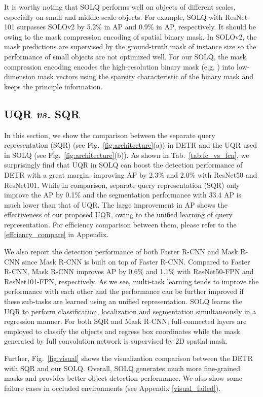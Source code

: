 \documentclass{article}
\begin{document}
It is worthy noting that SOLQ performs well on objects of different scales, especially on small and middle scale objects. For example, SOLQ with ResNet-101 surpasses SOLOv2 by 5.2\% in AP and 0.9\% in AP, respectively. It should be owing to the mask compression encoding of spatial binary mask. In SOLOv2, the mask predictions are supervised by the ground-truth mask of  instance size so the performance of small objects are not optimized well. For our SOLQ, the mask compression encoding encodes the high-resolution binary mask (e.g. ) into low-dimension mask vectors using the sparsity characteristic of the binary mask and keeps the principle information. 

\subsection{UQR \textit{vs.} SQR}
\label{uqr_vs_sqr}
In this section, we show the comparison between the separate query representation (SQR) (see Fig.~\ref{fig:architecture}(a)) in DETR and the UQR used in SOLQ (see Fig.~\ref{fig:architecture}(b)). As shown in Tab.~\ref{tab:fc_vs_fcn}, we surprisingly find that UQR in SOLQ can boost the detection performance of DETR with a great margin, improving AP by 2.3\% and 2.0\% with ResNet50 and ResNet101. While in comparison, separate query representation (SQR) only improve the AP by 0.1\% and the segmentation performance with 33.4 AP is much lower than that of UQR. The large improvement in AP shows the effectiveness of our proposed UQR, owing to the unified learning of query representation. For efficiency comparison between them, please refer to the \ref{effciency_compare} in Appendix.

We also report the detection performance of both Faster R-CNN and Mask R-CNN since Mask R-CNN is built on top of Faster R-CNN. Compared to Faster R-CNN, Mask R-CNN improves AP by 0.6\% and 1.1\% with ResNet50-FPN and ResNet101-FPN, respectively. As we see, multi-task learning tends to improve the performance with each other and the performance can be further improved if these sub-tasks are learned using an unified representation. SOLQ learns the UQR to perform  classification, localization and segmentation simultaneously in a regression manner. For both SQR and Mask R-CNN, full-connected layers are employed to classify the objects and regress box coordinates while the mask generated by full convolution network is supervised by 2D spatial mask.

Further, Fig.~\ref{fig:visual} shows the visualization comparison between the DETR with SQR and our SOLQ. Overall, SOLQ generates much more fine-grained masks and provides better object detection performance. We also show some failure cases in occluded environments (see Appendix \ref{visual_failed}).
\end{document}
